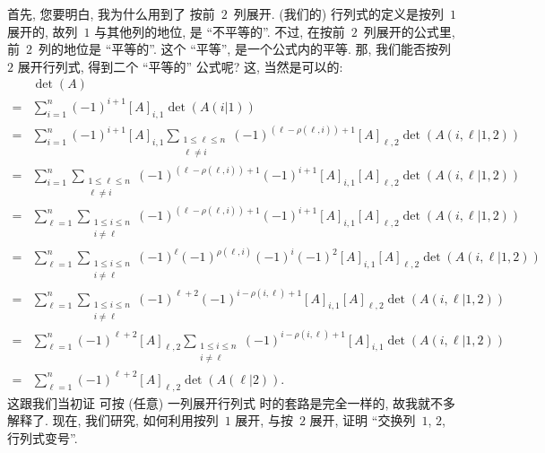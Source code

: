 \documentclass[%
    UTF8,%
    fontset=none,%
    punct=kaiming,%
    zihao=-4,%
    a4paper,%
    oneside,%
]{ctexbook}
\renewcommand*{\leq}{\leqslant}
\begin{document}
首先, 您要明白, 我为什么用到了%
按前~\(2\)~列展开.
(我们的) 行列式的定义是按列~\(1\) 展开的,
故列~\(1\) 与其他列的地位, 是 ``不平等的''.
不过, 在按前~\(2\)~列展开的公式里,
前~\(2\)~列的地位是 ``平等的''.
这个 ``平等'', 是一个公式内的平等.
那, 我们能否按列~\(2\) 展开行列式,
得到二个 ``平等的'' 公式呢?
这, 当然是可以的:
\begin{align*}
         & \det {(A)}                  \\
    = {} &
    \sum_{i = 1}^{n} {
    (-1)^{i+1} [A]_{i,1} \det {(A(i|1))}
    }
    \\
    = {} &
    \sum_{i = 1}^{n} {
    (-1)^{i+1} [A]_{i,1}
    \sum_{\substack{1 \leq \ell \leq n \\ \ell \neq i}} {
    (-1)^{(\ell - \rho(\ell, i)) + 1}
        [A]_{\ell,2} \det {(A({i,\ell}|{1,2}))}
    }
    }
    \\
    = {} &
    \sum_{i = 1}^{n} {
    \sum_{\substack{1 \leq \ell \leq n \\ \ell \neq i}} {
    (-1)^{(\ell - \rho(\ell, i)) + 1}
    (-1)^{i+1}
        [A]_{i,1} [A]_{\ell,2} \det {(A({i,\ell}|{1,2}))}
    }
    }
    \\
    = {} &
    \sum_{\ell = 1}^{n} {
    \sum_{\substack{1 \leq i \leq n    \\ i \neq \ell}} {
    (-1)^{(\ell - \rho(\ell, i)) + 1}
    (-1)^{i+1}
        [A]_{i,1} [A]_{\ell,2} \det {(A({i,\ell}|{1,2}))}
    }
    }
    \\
    = {} &
    \sum_{\ell = 1}^{n} {
    \sum_{\substack{1 \leq i \leq n    \\ i \neq \ell}} {
    (-1)^{\ell} (-1)^{\rho(\ell, i)} (-1)^{i} (-1)^{2}
        [A]_{i,1} [A]_{\ell,2} \det {(A({i,\ell}|{1,2}))}
    }
    }
    \\
    = {} &
    \sum_{\ell = 1}^{n} {
    \sum_{\substack{1 \leq i \leq n    \\ i \neq \ell}} {
    (-1)^{\ell + 2} (-1)^{i - \rho(i, \ell) + 1}
        [A]_{i,1} [A]_{\ell,2} \det {(A({i,\ell}|{1,2}))}
    }
    }
    \\
    = {} &
    \sum_{\ell = 1}^{n} {(-1)^{\ell + 2} [A]_{\ell,2}
    \sum_{\substack{1 \leq i \leq n    \\ i \neq \ell}} {
    (-1)^{i - \rho(i, \ell) + 1}
        [A]_{i,1} \det {(A({i,\ell}|{1,2}))}
    }
    }
    \\
    = {} &
    \sum_{\ell = 1}^{n} {(-1)^{\ell + 2} [A]_{\ell,2}
    \det {(A(\ell|2))}
    }.
\end{align*}
这跟我们当初证%
可按 (任意) 一列展开行列式%
时的套路是完全一样的,
故我就不多解释了.
现在, 我们研究,
如何利用按列~\(1\) 展开,
与按~\(2\) 展开,
证明 ``交换列~\(1\), \(2\), 行列式变号''.
\end{document}

